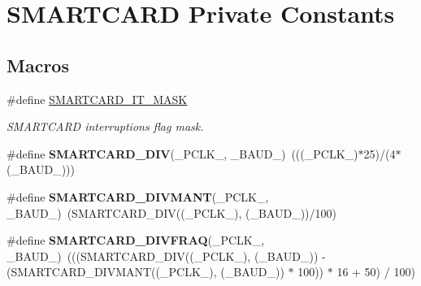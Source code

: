 \hypertarget{group___s_m_a_r_t_c_a_r_d___private___constants}{}\section{S\+M\+A\+R\+T\+C\+A\+RD Private Constants}
\label{group___s_m_a_r_t_c_a_r_d___private___constants}
\subsection*{Macros}
\begin{DoxyCompactItemize}
\item 
\#define \hyperlink{group___s_m_a_r_t_c_a_r_d___private___constants_ga2d4be8e0259fd370f82c53579c96ede5}{S\+M\+A\+R\+T\+C\+A\+R\+D\+\_\+\+I\+T\+\_\+\+M\+A\+SK}
\begin{DoxyCompactList}\small\item\em S\+M\+A\+R\+T\+C\+A\+RD interruptions flag mask. \end{DoxyCompactList}\item 
\#define {\bfseries S\+M\+A\+R\+T\+C\+A\+R\+D\+\_\+\+D\+IV}(\+\_\+\+P\+C\+L\+K\+\_\+,  \+\_\+\+B\+A\+U\+D\+\_\+)~(((\+\_\+\+P\+C\+L\+K\+\_\+)$\ast$25)/(4$\ast$(\+\_\+\+B\+A\+U\+D\+\_\+)))\hypertarget{group___s_m_a_r_t_c_a_r_d___private___constants_gac3c4b8ce9bfb1e8e10b0d125f32e98de}{}\label{group___s_m_a_r_t_c_a_r_d___private___constants_gac3c4b8ce9bfb1e8e10b0d125f32e98de}

\item 
\#define {\bfseries S\+M\+A\+R\+T\+C\+A\+R\+D\+\_\+\+D\+I\+V\+M\+A\+NT}(\+\_\+\+P\+C\+L\+K\+\_\+,  \+\_\+\+B\+A\+U\+D\+\_\+)~(S\+M\+A\+R\+T\+C\+A\+R\+D\+\_\+\+D\+IV((\+\_\+\+P\+C\+L\+K\+\_\+), (\+\_\+\+B\+A\+U\+D\+\_\+))/100)\hypertarget{group___s_m_a_r_t_c_a_r_d___private___constants_gab7333c627f9d4ab4b9be31e87344b9c5}{}\label{group___s_m_a_r_t_c_a_r_d___private___constants_gab7333c627f9d4ab4b9be31e87344b9c5}

\item 
\#define {\bfseries S\+M\+A\+R\+T\+C\+A\+R\+D\+\_\+\+D\+I\+V\+F\+R\+AQ}(\+\_\+\+P\+C\+L\+K\+\_\+,  \+\_\+\+B\+A\+U\+D\+\_\+)~(((S\+M\+A\+R\+T\+C\+A\+R\+D\+\_\+\+D\+IV((\+\_\+\+P\+C\+L\+K\+\_\+), (\+\_\+\+B\+A\+U\+D\+\_\+)) -\/ (S\+M\+A\+R\+T\+C\+A\+R\+D\+\_\+\+D\+I\+V\+M\+A\+NT((\+\_\+\+P\+C\+L\+K\+\_\+), (\+\_\+\+B\+A\+U\+D\+\_\+)) $\ast$ 100)) $\ast$ 16 + 50) / 100)\hypertarget{group___s_m_a_r_t_c_a_r_d___private___constants_gabb0df5c19fd44541a00667c27bdaf0df}{}\label{group___s_m_a_r_t_c_a_r_d___private___constants_gabb0df5c19fd44541a00667c27bdaf0df}


\end{DoxyCompactItemize}
